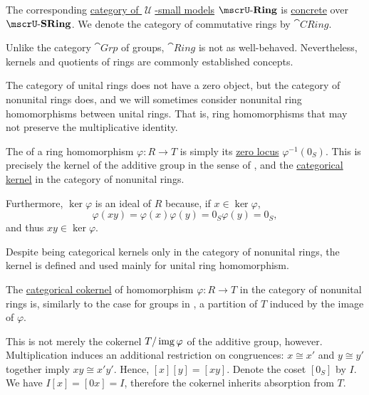 \begin{definition}
\begin{thmenum}
     The corresponding \hyperref[def:category_of_small_first_order_models]{category of \( \mscrU \)-small models} \( \ucat{Ring} \) is \hyperref[def:concrete_category]{concrete} over \hyperref[def:monoid]{\( \ucat{SRing} \)}. We denote the category of commutative rings by \( \cat{CRing} \).

    Unlike the category \hyperref[def:group/category]{\( \cat{Grp} \)} of groups, \( \cat{Ring} \) is not as well-behaved. Nevertheless, kernels and quotients of rings are commonly established concepts.

    The category of unital rings does not have a zero object, but the category of nonunital rings does, and we will sometimes consider nonunital ring homomorphisms between unital rings. That is, ring homomorphisms that may not preserve the multiplicative identity.

     The  of a ring homomorphism \( \varphi: R \to T \) is simply its \hyperref[def:zero_locus]{zero locus} \( \varphi^{-1}(0_S) \). This is precisely the kernel of the additive group in the sense of , and the \hyperref[def:zero_morphisms/cokernel]{categorical kernel} in the category of nonunital rings.

    Furthermore, \( \ker \varphi \) is an ideal of \( R \) because, if \( x \in \ker \varphi \),
    \begin{equation*}
      \varphi(xy)
      =
      \varphi(x) \varphi(y)
      =
      0_S \varphi(y)
      =
      0_S,
    \end{equation*}
    and thus \( xy \in \ker \varphi \).

    Despite being categorical kernels only in the category of nonunital rings, the kernel is defined and used mainly for unital ring homomorphism.

     The \hyperref[def:zero_morphisms/cokernel]{categorical cokernel} of homomorphism \( \varphi: R \to T \) in the category of nonunital rings is, similarly to the case for groups in , a partition of \( T \) induced by the image of \( \varphi \).

    This is not merely the cokernel \( T / \operatorname{img} \varphi \) of the additive group, however. Multiplication induces an additional restriction on congruences: \( x \cong x' \) and \( y \cong y' \) together imply \( x y \cong x' y' \). Hence, \( [x][y] = [xy] \).  Denote the coset \( [0_S] \) by \( I \). We have \( I[x] = [0x] = I \), therefore the cokernel inherits absorption from \( T \).


\end{thmenum}
\end{definition}
